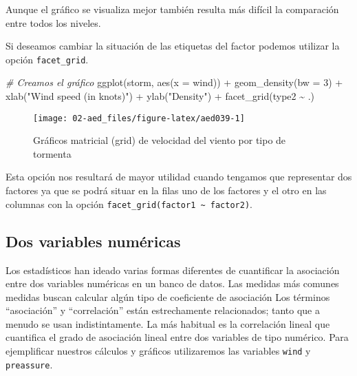 \documentclass[
]{book}
\newenvironment{Shaded}{\begin{snugshade}}{\end{snugshade}}
\newcommand{\AttributeTok}[1]{\textcolor[rgb]{0.77,0.63,0.00}{#1}}
\newcommand{\CommentTok}[1]{\textcolor[rgb]{0.56,0.35,0.01}{\textit{#1}}}
\newcommand{\DecValTok}[1]{\textcolor[rgb]{0.00,0.00,0.81}{#1}}
\newcommand{\FunctionTok}[1]{\textcolor[rgb]{0.00,0.00,0.00}{#1}}
\newcommand{\NormalTok}[1]{#1}
\newcommand{\SpecialCharTok}[1]{\textcolor[rgb]{0.00,0.00,0.00}{#1}}
\newcommand{\StringTok}[1]{\textcolor[rgb]{0.31,0.60,0.02}{#1}}
\begin{document}
Aunque el gráfico se visualiza mejor también resulta más difícil la comparación entre todos los niveles.

Si deseamos cambiar la situación de las etiquetas del factor podemos utilizar la opción \texttt{facet\_grid}.

\begin{Shaded}
\begin{Highlighting}[]
\CommentTok{\# Creamos el gráfico}
\FunctionTok{ggplot}\NormalTok{(storm, }\FunctionTok{aes}\NormalTok{(}\AttributeTok{x =}\NormalTok{ wind))  }\SpecialCharTok{+}
  \FunctionTok{geom\_density}\NormalTok{(}\AttributeTok{bw =} \DecValTok{3}\NormalTok{) }\SpecialCharTok{+} 
  \FunctionTok{xlab}\NormalTok{(}\StringTok{"Wind speed (in knots)"}\NormalTok{) }\SpecialCharTok{+}
  \FunctionTok{ylab}\NormalTok{(}\StringTok{"Density"}\NormalTok{) }\SpecialCharTok{+}
  \FunctionTok{facet\_grid}\NormalTok{(type2 }\SpecialCharTok{\textasciitilde{}}\NormalTok{ .)}
\end{Highlighting}
\end{Shaded}

\begin{figure}

{\centering \texttt{[image: 02-aed\_files/figure-latex/aed039-1]} 

}

\caption{Gráficos matricial (grid) de velocidad del viento por tipo de tormenta}\label{fig:aed039}
\end{figure}

Esta opción nos resultará de mayor utilidad cuando tengamos que representar dos factores ya que se podrá situar en la filas uno de los factores y el otro en las columnas con la opción \texttt{facet\_grid(factor1\ \textasciitilde{}\ factor2)}.

\hypertarget{dos-variables-numuxe9ricas}{%
\subsection{Dos variables numéricas}\label{dos-variables-numuxe9ricas}}

Los estadísticos han ideado varias formas diferentes de cuantificar la asociación entre dos variables numéricas en un banco de datos. Las medidas más comunes medidas buscan calcular algún tipo de coeficiente de asociación Los términos ``asociación'' y ``correlación'' están estrechamente relacionados; tanto que a menudo se usan indistintamente. La más habitual es la correlación lineal que cuantifica el grado de asociación lineal entre dos variables de tipo numérico. Para ejemplificar nuestros cálculos y gráficos utilizaremos las variables \texttt{wind} y \texttt{preassure}.
\end{document}
